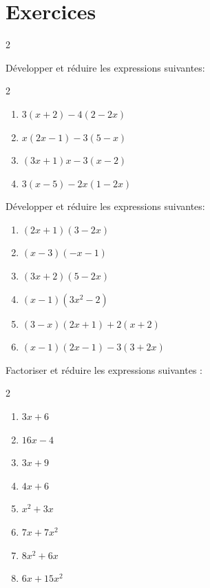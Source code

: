 \newpage
\section{Exercices}
 {
  \small
  \begin{multicols}{2}
	  \begin{exo}[Développement]
		  Développer et réduire les expressions suivantes:
		  \vspace*{-2mm}
		  \begin{multicols}{2}
			  \begin{enumerate}[label=\alph*)]
				  \item $3(x + 2) - 4(2 - 2x)$
				  \item $x(2x - 1) - 3(5 - x)$
				  \item $(3x + 1)x - 3(x - 2)$
				  \item $3(x - 5) - 2x(1 - 2x)$
			  \end{enumerate}
		  \end{multicols}
	  \end{exo}

	  \begin{exo}[Développement]
		  Développer et réduire les expressions suivantes:
		  \begin{enumerate}[label=\alph*)]
			  \item $(2x + 1)(3 - 2x)$
			  \item $(x - 3)(-x - 1)$
			  \item $(3x + 2)(5 - 2x)$
			  \item $(x - 1)(3x^{2} - 2)$
			  \item $(3 - x)(2x + 1) + 2(x + 2)$
			  \item $(x - 1)(2x - 1) - 3(3 + 2x)$
		  \end{enumerate}
	  \end{exo}

	  \begin{exo}[Factorisation]
		  Factoriser et réduire les expressions suivantes :
		  \vspace*{-2mm}
		  \begin{multicols}{2}
			  \begin{enumerate}[label=\alph*)]
				  \item $3x + 6$
				  \item $16x - 4$
				  \item $3x + 9$
				  \item $4x + 6$
				  \item $x^{2} + 3x$
				  \item $7x + 7x^{2}$
				  \item $8x^{2} + 6x$
				  \item $6x + 15x^{2}$
			  \end{enumerate}
		  \end{multicols}
	  \end{exo}


\end{multicols}}
